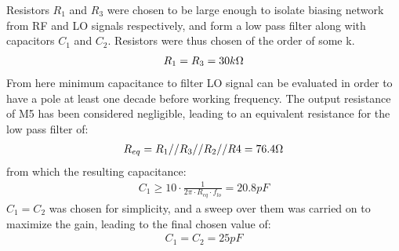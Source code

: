 Resistors \(R_1\) and \(R_3\) were chosen to be large enough to isolate biasing network from RF and LO signals respectively, and form a low pass filter along with capacitors \(C_1\) and \(C_2\). Resistors were thus chosen of the order of some k\ohm.
\begin{align}
	R_1=R_3=30k\ohm \nonumber
\end{align}
From here minimum capacitance to filter LO signal can be evaluated in order to have a pole at least one decade before working frequency. The output resistance of M5 has been considered negligible, leading to an equivalent resistance for the low pass filter of:
\begin{align}
	R_{eq}=R_1//R_3//R_2//R4=76.4 \ohm \nonumber \\
\end{align}
from which the resulting capacitance:
\begin{align}
	C_1\ge 10\cdot \frac{1}{2\pi \cdot R_{eq} \cdot f_{lo }} = 20.8pF
\end{align}
\(C_1 = C_2\) was chosen for simplicity, and a sweep over them was carried on to maximize the gain, leading to the final chosen value of:
\begin{align}
	C_1=C_2=25pF
\end{align}